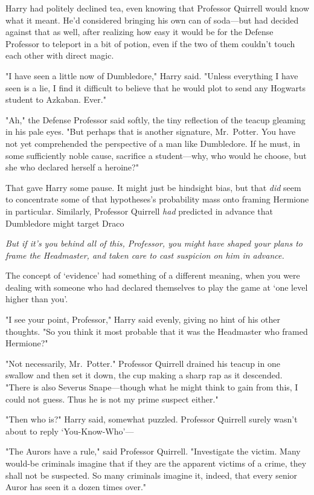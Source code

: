 Harry had politely declined tea, even knowing that Professor Quirrell would
know what it meant. He'd considered bringing his own can of soda—but had
decided against that as well, after realizing how easy it would be for the
Defense Professor to teleport in a bit of potion, even if the two of them
couldn't touch each other with direct magic.

"I have seen a little now of Dumbledore," Harry said. "Unless everything I have
seen is a lie, I find it difficult to believe that he would plot to send any
Hogwarts student to Azkaban. Ever."

"Ah," the Defense Professor said softly, the tiny reflection of the teacup
gleaming in his pale eyes. "But perhaps that is another signature, Mr.~Potter.
You have not yet comprehended the perspective of a man like Dumbledore. If he
must, in some sufficiently noble cause, sacrifice a student—why, who would he
choose, but she who declared herself a heroine?"

That gave Harry some pause. It might just be hindsight bias, but that
\emph{did} seem to concentrate some of that hypotheses's probability mass onto
framing Hermione in particular. Similarly, Professor Quirrell \emph{had}
predicted in advance that Dumbledore might target Draco{\el}

\emph{But if it's you behind all of this, Professor, you might have shaped your
plans to frame the Headmaster, and taken care to cast suspicion on him in
advance.}

The concept of `evidence' had something of a different meaning, when you were
dealing with someone who had declared themselves to play the game at `one level
higher than you'.

"I see your point, Professor," Harry said evenly, giving no hint of his other
thoughts. "So you think it most probable that it was the Headmaster who framed
Hermione?"

"Not necessarily, Mr.~Potter." Professor Quirrell drained his teacup in one
swallow and then set it down, the cup making a sharp rap as it descended.
"There is also Severus Snape—though what he might think to gain from this, I
could not guess. Thus he is not my prime suspect either."

"Then who is?" Harry said, somewhat puzzled. Professor Quirrell surely wasn't
about to reply `You-Know-Who'—

"The Aurors have a rule," said Professor Quirrell. "Investigate the victim.
Many would-be criminals imagine that if they are the apparent victims of a
crime, they shall not be suspected. So many criminals imagine it, indeed, that
every senior Auror has seen it a dozen times over."

